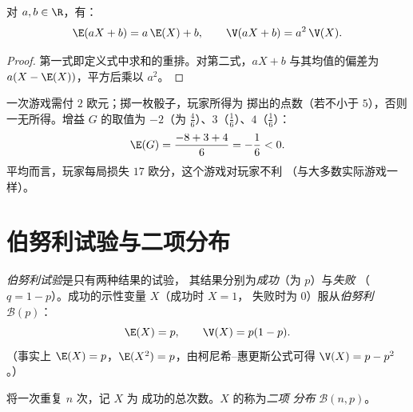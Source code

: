 \begin{proposition}[仿射变换]\label{prop:g12:randvar:affine}
对 $a, b \in \R$，有：
\[
\E(aX + b) = a\,\E(X) + b, \qquad
\V(aX + b) = a^2\,\V(X) .
\]
\end{proposition}

\begin{proof}
第一式即定义式中求和的重排。对第二式，$aX + b$
与其均值的偏差为 $a(X - \E(X))$，平方后乘以
$a^2$。
\end{proof}

\begin{example}[公平游戏]\label{ex:g12:randvar:game}
一次游戏需付 $2$ 欧元；掷一枚骰子，玩家所得为
掷出的点数（若不小于 $5$），否则一无所得。增益 $G$ 的取值为
$-2$（为 $\frac46$）、$3$（$\frac16$）、$4$（$\frac16$）：
\[
\E(G) = \frac{-8 + 3 + 4}{6} = -\frac{1}{6} < 0 .
\]
平均而言，玩家每局损失 $17$ 欧分，这个游戏对玩家不利
（与大多数实际游戏一样）。
\end{example}

\section{伯努利试验与二项分布}

\begin{definition}[伯努利分布]\label{def:g12:randvar:bernoulli}
\emph{伯努利试验}是只有两种结果的试验，
其结果分别为\emph{成功}（为 $p$）与\emph{失败}
（$q = 1 - p$）。成功的示性变量 $X$（成功时 $X = 1$，
失败时为 $0$）服从\emph{伯努利} $\mathcal B(p)$：
\[
\E(X) = p, \qquad \V(X) = p(1-p) .
\]
（事实上 $\E(X) = p$，$\E(X^2) = p$，由柯尼希--惠更斯公式可得
$\V(X) = p - p^2$。）
\end{definition}

\begin{definition}[二项分布]\label{def:g12:randvar:binomial}
将一次重复 $n$ 次，记 $X$ 为
成功的总次数。$X$ 的称为\emph{二项
分布} $\mathcal B(n, p)$。
\end{definition}

